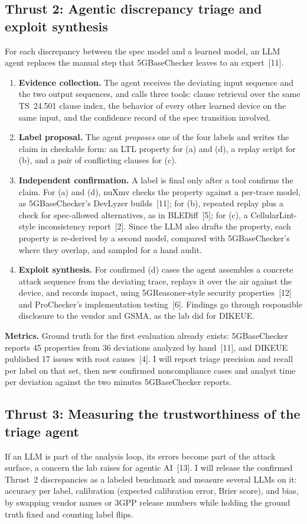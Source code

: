 \documentclass[11pt,letterpaper]{article}
\begin{document}
\subsection*{Thrust 2: Agentic discrepancy triage and exploit synthesis}
For each discrepancy between the spec model and a learned model, an LLM agent replaces the manual step that 5GBaseChecker leaves to an expert~[11].
\begin{enumerate}
  \item \textbf{Evidence collection.} The agent receives the deviating input sequence and the two output sequences, and calls three tools: clause retrieval over the same TS~24.501 clause index, the behavior of every other learned device on the same input, and the confidence record of the spec transition involved.
  \item \textbf{Label proposal.} The agent \emph{proposes} one of the four labels and writes the claim in checkable form: an LTL property for (a) and (d), a replay script for (b), and a pair of conflicting clauses for (c).
  \item \textbf{Independent confirmation.} A label is final only after a tool confirms the claim. For (a) and (d), nuXmv checks the property against a per-trace model, as 5GBaseChecker's DevLyzer builds~[11]; for (b), repeated replay plus a check for spec-allowed alternatives, as in BLEDiff~[5]; for (c), a CellularLint-style inconsistency report~[2]. Since the LLM also drafts the property, each property is re-derived by a second model, compared with 5GBaseChecker's where they overlap, and sampled for a hand audit.
  \item \textbf{Exploit synthesis.} For confirmed (d) cases the agent assembles a concrete attack sequence from the deviating trace, replays it over the air against the device, and records impact, using 5GReasoner-style security properties~[12] and ProChecker's implementation testing~[6]. Findings go through responsible disclosure to the vendor and GSMA, as the lab did for DIKEUE.
\end{enumerate}
\textbf{Metrics.} Ground truth for the first evaluation already exists: 5GBaseChecker reports 45 properties from 36 deviations analyzed by hand~[11], and DIKEUE published 17 issues with root causes~[4]. I will report triage precision and recall per label on that set, then new confirmed noncompliance cases and analyst time per deviation against the two minutes 5GBaseChecker reports.

\subsection*{Thrust 3: Measuring the trustworthiness of the triage agent}
If an LLM is part of the analysis loop, its errors become part of the attack surface, a concern the lab raises for agentic AI~[13]. I will release the confirmed Thrust~2 discrepancies as a labeled benchmark and measure several LLMs on it: accuracy per label, calibration (expected calibration error, Brier score), and bias, by swapping vendor names or 3GPP release numbers while holding the ground truth fixed and counting label flips.
\end{document}

